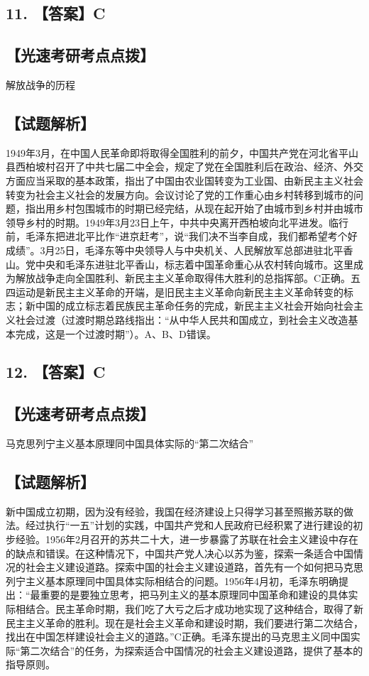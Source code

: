 \documentclass[UTF8,11pt]{ctexart}
\begin{document}
\subsection*{11. 【答案】C}

\subsection*{【光速考研考点点拨】}

解放战争的历程


\subsection*{【试题解析】}

1949年3月，在中国人民革命即将取得全国胜利的前夕，中国共产党在河北省平山县西柏坡村召开了中共七届二中全会，规定了党在全国胜利后在政治、经济、外交方面应当采取的基本政策，指出了中国由农业国转变为工业国、由新民主主义社会转变为社会主义社会的发展方向。会议讨论了党的工作重心由乡村转移到城市的问题，指出用乡村包围城市的时期已经完结，从现在起开始了由城市到乡村并由城市领导乡村的时期。1949年3月23日上午，中共中央离开西柏坡向北平进发。临行前，毛泽东把进北平比作“进京赶考”，说“我们决不当李自成，我们都希望考个好成绩”。3月25日，毛泽东等中央领导人与中央机关、人民解放军总部进驻北平香山。党中央和毛泽东进驻北平香山，标志着中国革命重心从农村转向城市。这里成为解放战争走向全国胜利、新民主主义革命取得伟大胜利的总指挥部。C正确。五四运动是新民主主义革命的开端，是旧民主主义革命向新民主主义革命转变的标志；新中国的成立标志着民族民主革命任务的完成，新民主主义社会开始向社会主义社会过渡（过渡时期总路线指出：“从中华人民共和国成立，到社会主义改造基本完成，这是一个过渡时期”）。A、B、D错误。


\subsection*{12. 【答案】C}

\subsection*{【光速考研考点点拨】}

马克思列宁主义基本原理同中国具体实际的“第二次结合”


\subsection*{【试题解析】}

新中国成立初期，因为没有经验，我国在经济建设上只得学习甚至照搬苏联的做法。经过执行“一五”计划的实践，中国共产党和人民政府已经积累了进行建设的初步经验。1956年2月召开的苏共二十大，进一步暴露了苏联在社会主义建设中存在的缺点和错误。在这种情况下，中国共产党人决心以苏为鉴，探索一条适合中国情况的社会主义建设道路。探索中国的社会主义建设道路，首先有一个如何把马克思列宁主义基本原理同中国具体实际相结合的问题。1956年4月初，毛泽东明确提出：“最重要的是要独立思考，把马列主义的基本原理同中国革命和建设的具体实际相结合。民主革命时期，我们吃了大亏之后才成功地实现了这种结合，取得了新民主主义革命的胜利。现在是社会主义革命和建设时期，我们要进行第二次结合，找出在中国怎样建设社会主义的道路。”C正确。毛泽东提出的马克思主义同中国实际“第二次结合”的任务，为探索适合中国情况的社会主义建设道路，提供了基本的指导原则。
\end{document}
